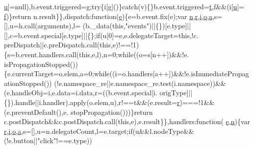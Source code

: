 \begin{DoxyCode}
{{      \hyperlink{jquery-migrate-1_82_81_8min_8js_accb4ce8dd4113ac0f510653e31809106}{u}]=null),b.event.triggered=g;\textcolor{keywordflow}{try}\{i[g]()\}\textcolor{keywordflow}{catch}(v)\{\}b.event.triggered=\hyperlink{jquery-1_89_81_8min_8js_a23c5666e83bbbceee94adcd0851f50c4}{t},f&&(i[\hyperlink{jquery-migrate-1_82_81_8min_8js_accb4ce8dd4113ac0f510653e31809106}{u}]=
      \hyperlink{jquery-migrate-1_82_81_8min_8js_a9cf09a2972472098a4c689fd988f4dfc}{f})\}\textcolor{keywordflow}{return} n.result\}\},dispatch:\textcolor{keyword}{function}(\hyperlink{jquery-1_89_81_8min_8js_a2c038346d47955cbe2cb91e338edd7e1}{e})\{e=b.event.fix(e);var \hyperlink{root_2static_2root_2js_2bootstrap_2jquery-ui-1_810_84_8custom_8min_8js_afc984c4f6c68ce30a0af99006f5f8d27}{n},\hyperlink{prism_8js_a514f1b439f404f86f77090fa9edc96ce}{r},\hyperlink{jquery-1_89_81_8min_8js_a7e98b8a17c0aad30ba64d47b74e2a6c1}{i},\hyperlink{jquery-1_89_81_8min_8js_ae47ca7a09cf6781e29634502345930a7}{o},\hyperlink{root_2static_2root_2js_2bootstrap_2bootstrap_8min_8js_ae8f6b400ed3390908c5cdeebed3a82b9}{a},s=[],u=h.call(arguments),l=
      (b.\_data(\textcolor{keyword}{this},\textcolor{stringliteral}{"events"})||\{\})[e.type]||[],c=b.event.special[e.type]||\{\};\textcolor{keywordflow}{if}(u[0]=e,e.delegateTarget=\textcolor{keyword}{this},!c.
      preDispatch||c.preDispatch.call(\textcolor{keyword}{this},e)!==!1)\{s=b.event.handlers.call(\textcolor{keyword}{this},e,l),n=0;\textcolor{keywordflow}{while}((o=s[n++])&&!e.
      isPropagationStopped())\{e.currentTarget=o.elem,a=0;\textcolor{keywordflow}{while}((i=o.handlers[a++])&&!e.isImmediatePropagationStopped())
      (!e.namespace\_re||e.namespace\_re.test(i.namespace))&&(e.handleObj=i,e.data=i.data,r=((b.event.special[i.
      origType]||\{\}).handle||i.handler).apply(o.elem,u),r!==t&&(e.result=\hyperlink{prism_8js_a514f1b439f404f86f77090fa9edc96ce}{r})===!1&&(e.preventDefault(),e.
      stopPropagation()))\}\textcolor{keywordflow}{return} c.postDispatch&&c.postDispatch.call(\textcolor{keyword}{this},e),e.result\}\},handlers:\textcolor{keyword}{function}(
      \hyperlink{jquery-1_89_81_8min_8js_a2c038346d47955cbe2cb91e338edd7e1}{e},\hyperlink{root_2static_2root_2js_2bootstrap_2jquery-ui-1_810_84_8custom_8min_8js_afc984c4f6c68ce30a0af99006f5f8d27}{n})\{var \hyperlink{prism_8js_a514f1b439f404f86f77090fa9edc96ce}{r},\hyperlink{jquery-1_89_81_8min_8js_a7e98b8a17c0aad30ba64d47b74e2a6c1}{i},\hyperlink{jquery-1_89_81_8min_8js_ae47ca7a09cf6781e29634502345930a7}{o},\hyperlink{root_2static_2root_2js_2bootstrap_2bootstrap_8min_8js_ae8f6b400ed3390908c5cdeebed3a82b9}{a},s=[],u=n.delegateCount,l=e.target;\textcolor{keywordflow}{if}(u&&l.nodeType&&(!e.button||\textcolor{stringliteral}{"click"}!==e.type))\textcolor{keywordflow}{
}}}
\end{DoxyCode}
